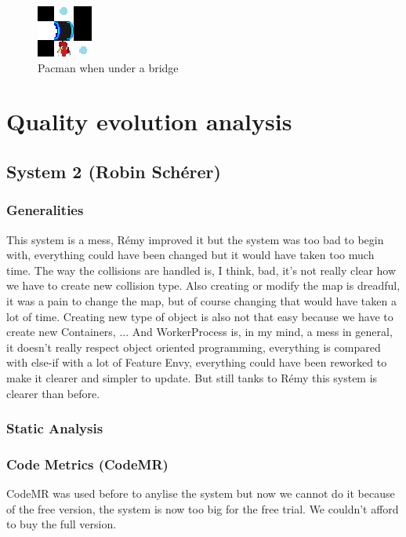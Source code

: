 \documentclass[]{article}
\begin{document}
\begin{figure}[h!]
\centering
\includegraphics[width=0.2\linewidth]{bridge3.png}
\caption{Pacman when under a bridge}
\label{fig:bridge}
\end{figure}


\section{Quality evolution analysis}
\subsection{System 2 (Robin Schérer)}

\subsubsection{Generalities}

This system is a mess, Rémy improved it but the system was too bad to begin with, everything could have been changed but it would have taken too much time. The way the collisions are handled is, I think, bad, it's not really clear how we have to create new collision type. Also creating or modify the map is dreadful, it was a pain to change the map, but of course changing that would have taken a lot of time. Creating new type of object is also not that easy because we have to create new Containers, ... And WorkerProcess is, in my mind, a mess in general, it doesn't really respect object oriented programming, everything is compared with else-if with a lot of Feature Envy, everything could have been reworked to make it clearer and simpler to update. But still tanks to Rémy this system is clearer than before.

\subsubsection{Static Analysis}
\subsubsection{Code Metrics (CodeMR)}
  CodeMR was used before to anylise the system but now we cannot do it because of the free version, the system is now too big for the free trial. We couldn't afford to buy the full version.
\end{document}
